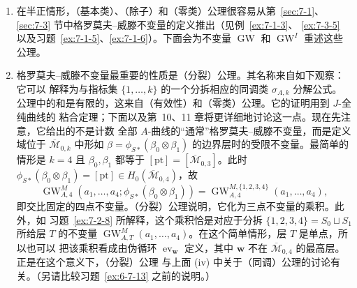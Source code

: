 \begin{remark}
\begin{enumerate}[label=\textup{(\roman*)},leftmargin=3em]
注意，我们只在 $\mathbf w$ 属于 $\overline{\mathcal M}_{0,I}$ 的最高层时，证明了这个
伪循环与 $\mathbf w$ 的选择无关。换言之，由于不能假定 $\sigma_{A,k}$ 存在，我们对
$\tau_{A,I}$ 的定义原则上可能依赖于所选的 $[Y_{k,I}]$ 代表元。下面将看到，（分裂）公理
说明，尽管不能允许完全任意的 $[Y_{k,I}]$ 代表元，至少可以任取一点
$\mathbf w\in\overline{\mathcal M}_{0,I}$。
\item 在半正情形，（基本类）、（除子）和（零类）公理很容易从第~\ref{sec:7-1}、
\ref{sec:7-3} 节中格罗莫夫--威滕不变量的定义推出（见例~\ref{ex:7-1-3}、
\ref{ex:7-3-5} 以及习题~\ref{ex:7-1-5}、\ref{ex:7-1-6}）。下面会为不变量
$\operatorname{GW}$ 和
$\operatorname{GW}^I$ 重述这些公理。
\item {}格罗莫夫--威滕不变量最重要的性质是（分裂）公理。其名称来自如下观察：它可以
解释为与指标集 $\{1,\ldots,k\}$ 的一个分拆相应的同调类 $\sigma_{A,k}$ 分解公式。
公理中的和是有限的，这来自（有效性）和（零类）公理。它的证明用到 $J$-全纯曲线的
粘合定理；下面以及第~10、11 章将更详细地讨论这一点。现在先注意，它给出的不是计数
全部 $A$-曲线的“通常”格罗莫夫--威滕不变量，而是定义域位于
$\overline{\mathcal M}_{0,k}$ 中形如
$\beta=\phi_{S*}(\beta_0\otimes\beta_1)$ 的边界层时的受限不变量。最简单的情形是
$k=4$ 且 $\beta_0,\beta_1$ 都等于
$[\mathrm{pt}]=[\overline{\mathcal M}_{0,3}]$。此时
$\phi_{S*}(\beta_0\otimes\beta_1)=[\mathrm{pt}]
\in H_0(\overline{\mathcal M}_{0,4})$，故
\[
  \operatorname{GW}_{A,4}^M
  (a_1,\ldots,a_4;\phi_{S*}(\beta_0\otimes\beta_1))
  =\operatorname{GW}_{A,4}^{M,\{1,2,3,4\}}(a_1,\ldots,a_4),
\]
即交比固定的四点不变量。（分裂）公理说明，它化为三点不变量的乘积。此外，如
习题~\ref{ex:7-2-8} 所解释，这个乘积恰是对应于分拆
$\{1,2,3,4\}=S_0\sqcup S_1$ 所给层 $T$ 的不变量
$\operatorname{GW}_{A,T}^M(a_1,\ldots,a_4)$。在这个简单情形，层 $T$ 是单点，所以也可以
把该乘积看成由伪循环 $\operatorname{ev}_{\mathbf w}$ 定义，其中
$\mathbf w$ 不在 $\overline{\mathcal M}_{0,4}$ 的最高层。正是在这个意义下，（分裂）公理
与上面 (iv) 中关于（同调）公理的讨论有关。（另请比较习题~\ref{ex:6-7-13} 之前的说明。）
\end{enumerate}
\end{remark}

